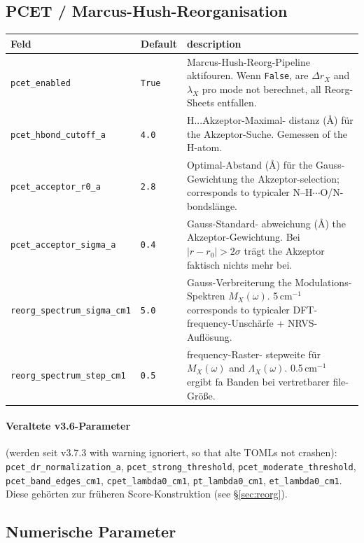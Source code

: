 \documentclass[11pt,a4paper,twoside]{article}
\theoremstyle{remark}
\begin{document}
\subsection{PCET / Marcus-Hush-Reorganisation}

\begin{longtable}{p{} p{} p{}}
\toprule
\textbf{Feld} & \textbf{Default} & \textbf{description} \\
\midrule
\endhead
\texttt{pcet\_enabled} & \texttt{True} & Marcus-Hush-Reorg-Pipeline
  aktifouren. Wenn \texttt{False}, are $\Delta r_X$ and $\lambda_X$
  pro mode not berechnet, all Reorg-Sheets entfallen. \\
\texttt{pcet\_hbond\_cutoff\_a} & \texttt{4.0} & H...Akzeptor-Maximal-
  distanz (\AA{}) f\"ur the Akzeptor-Suche. Gemessen of the H-atom. \\
\texttt{pcet\_acceptor\_r0\_a} & \texttt{2.8} & Optimal-Abstand
  (\AA{}) f\"ur the Gauss-Gewichtung the Akzeptor-selection;
  corresponds to typicaler N--H$\cdots$O/N-bondsl\"ange. \\
\texttt{pcet\_acceptor\_sigma\_a} & \texttt{0.4} & Gauss-Standard-
  abweichung (\AA{}) the Akzeptor-Gewichtung. Bei
  $|r - r_0| > 2\sigma$ tr\"agt the Akzeptor faktisch nichts mehr bei. \\
\texttt{reorg\_spectrum\_sigma\_cm1} & \texttt{5.0} & Gauss-Verbreiterung
  the Modulations-Spektren $M_X(\omega)$. 5\,cm$^{-1}$ corresponds to
  typicaler DFT-frequency-Unsch\"arfe + NRVS-Aufl\"osung. \\
\texttt{reorg\_spectrum\_step\_cm1} & \texttt{0.5} & frequency-Raster-
  stepweite f\"ur $M_X(\omega)$ and $\Lambda_X(\omega)$. 0.5\,cm$^{-1}$
  ergibt fa Banden bei vertretbarer file-Gr\"o{\ss}e. \\
\bottomrule
\end{longtable}

\paragraph{Veraltete v3.6-Parameter} (werden seit v3.7.3 with warning
ignoriert, so that alte TOMLs not crashen): \texttt{pcet\_dr\_normalization\_a},
\texttt{pcet\_strong\_threshold}, \texttt{pcet\_moderate\_threshold},
\texttt{pcet\_band\_edges\_cm1}, \texttt{cpet\_lambda0\_cm1},
\texttt{pt\_lambda0\_cm1}, \texttt{et\_lambda0\_cm1}. Diese geh\"orten
zur fr\"uheren Score-Konstruktion (see \S\ref{sec:reorg}).

\subsection{Numerische Parameter}
\end{document}
